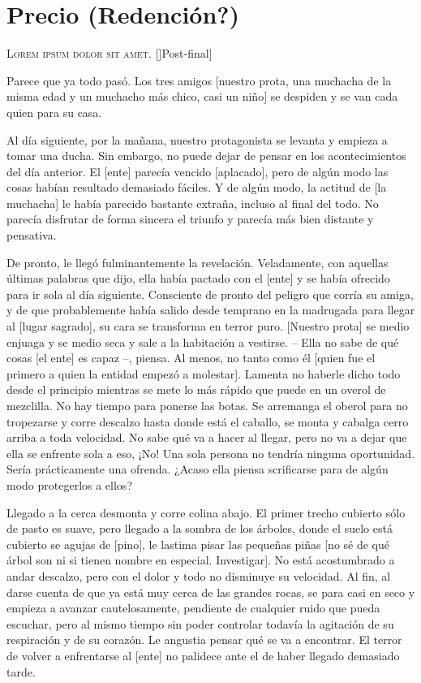 

\chapter{Precio (Redención?)}
\lettrine{L}{orem ipsum dolor sit amet}. []Post-final]

Parece que ya todo pasó. Los tres amigos [nuestro prota, una muchacha de la misma edad y un muchacho más chico, casi un niño] se despiden y se van cada quien para su casa.

Al día siguiente, por la mañana, nuestro protagonista se levanta y empieza a tomar una ducha. Sin embargo, no puede dejar de pensar en los acontecimientos del día anterior. El [ente] parecía vencido [aplacado], pero de algún modo las cosas habían resultado demasiado fáciles. Y de algún modo, la actitud de [la muchacha] le había parecido bastante extraña, incluso al final del todo. No parecía disfrutar de forma sincera el triunfo y parecía más bien distante y pensativa.

De pronto, le llegó fulminantemente la revelación. Veladamente, con aquellas últimas palabras que dijo, ella había pactado con el [ente] y se había ofrecido para ir sola al día siguiente. Consciente de pronto del peligro que corría su amiga, y de que probablemente había salido desde temprano en la madrugada para llegar al [lugar sagrado], su cara se transforma en terror puro. [Nuestro prota] se medio enjuaga y se medio seca y sale a la habitación a vestirse. -- Ella no sabe de qué cosas [el ente] es capaz --, piensa. Al menos, no tanto como él [quien fue el primero a quien la entidad empezó a molestar]. Lamenta no haberle dicho todo desde el principio mientras se mete lo más rápido que puede en un overol de mezclilla. No hay tiempo para ponerse las botas. Se arremanga el oberol para no tropezarse y corre descalzo hasta donde está el caballo, se monta y cabalga cerro arriba a toda velocidad. No sabe qué va a hacer al llegar, pero no va a dejar que ella se enfrente sola a eso, ¡No! Una sola persona no tendría ninguna oportunidad. Sería prácticamente una ofrenda. ¿Acaso ella piensa scrificarse para de algún modo protegerlos a ellos?

Llegado a la cerca desmonta y corre colina abajo. El primer trecho cubierto sólo de pasto es suave, pero llegado a la sombra de los árboles, donde el suelo está cubierto se agujas de [pino], le lastima pisar las pequeñas piñas [no sé de qué árbol son ni si tienen nombre en especial. Investigar]. No está acostumbrado a andar descalzo, pero con el dolor y todo no disminuye su velocidad. Al fin, al darse cuenta de que ya está muy cerca de las grandes rocas, se para casi en seco y empieza a avanzar cautelosamente, pendiente de cualquier ruido que pueda escuchar, pero al mismo tiempo sin poder controlar todavía la agitación de su respiración y de su corazón. Le angustia pensar qué se va a encontrar. El terror de volver a enfrentarse al [ente] no palidece ante el de haber llegado demasiado tarde.


